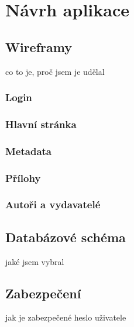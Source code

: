 \chapter{Návrh aplikace}

    \section{Wireframy}
        co to je, proč jsem je udělal
        \subsection{Login}
            
        \subsection{Hlavní stránka}
        
        \subsection{Metadata}
        
        \subsection{Přílohy}
        
        \subsection{Autoři a vydavatelé}

    \section{Databázové schéma}
        jaké jsem vybral
    \section{Zabezpečení}
        jak je zabezpečené heslo uživatele
